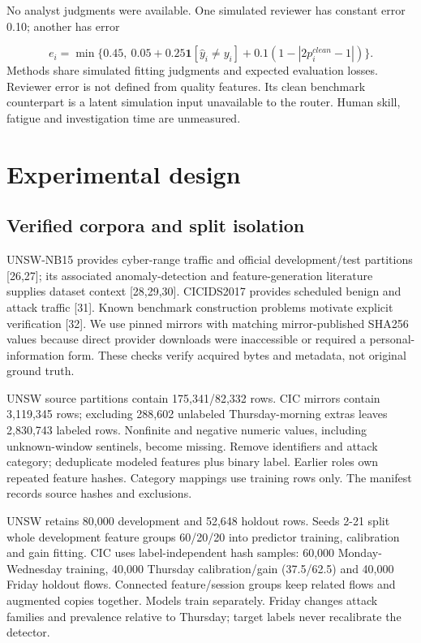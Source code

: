 \documentclass[11pt,letterpaper]{article}
\begin{document}
No analyst judgments were available. One simulated reviewer has constant error 0.10; another has error

\begin{equation}e_i=\min\{0.45,\ 0.05+0.25\mathbf{1}[\hat y_i\ne y_i]+0.1(1-|2p_i^{clean}-1|)\}.\end{equation}
Methods share simulated fitting judgments and expected evaluation losses. Reviewer error is not defined from quality features. Its clean benchmark counterpart is a latent simulation input unavailable to the router. Human skill, fatigue and investigation time are unmeasured.

\section{Experimental design}
\subsection{Verified corpora and split isolation}
UNSW-NB15 provides cyber-range traffic and official development/test partitions {[}26,27{]}; its associated anomaly-detection and feature-generation literature supplies dataset context {[}28,29,30{]}. CICIDS2017 provides scheduled benign and attack traffic {[}31{]}. Known benchmark construction problems motivate explicit verification {[}32{]}. We use pinned mirrors with matching mirror-published SHA256 values because direct provider downloads were inaccessible or required a personal-information form. These checks verify acquired bytes and metadata, not original ground truth.

UNSW source partitions contain 175,341/82,332 rows. CIC mirrors contain 3,119,345 rows; excluding 288,602 unlabeled Thursday-morning extras leaves 2,830,743 labeled rows. Nonfinite and negative numeric values, including unknown-window sentinels, become missing. Remove identifiers and attack category; deduplicate modeled features plus binary label. Earlier roles own repeated feature hashes. Category mappings use training rows only. The manifest records source hashes and exclusions.

UNSW retains 80,000 development and 52,648 holdout rows. Seeds 2-21 split whole development feature groups 60/20/20 into predictor training, calibration and gain fitting. CIC uses label-independent hash samples: 60,000 Monday-Wednesday training, 40,000 Thursday calibration/gain (37.5/62.5) and 40,000 Friday holdout flows. Connected feature/session groups keep related flows and augmented copies together. Models train separately. Friday changes attack families and prevalence relative to Thursday; target labels never recalibrate the detector.
\end{document}
